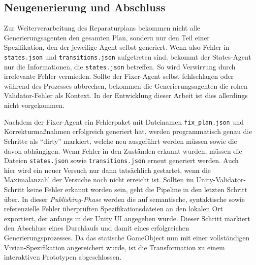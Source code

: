 \subsection*{Neugenerierung und Abschluss}

Zur Weiterverarbeitung des Reparaturplans bekommen nicht alle Generierungsagenten den gesamten Plan, sondern nur den Teil einer Spezifikation, den der jeweilige Agent selbst generiert. Wenn also Fehler in \texttt{states.json} und \texttt{transitions.json}  aufgetreten sind, bekommt der States-Agent nur die Informationen, die \texttt{states.json} betreffen. So wird Verwirrung durch irrelevante Fehler vermieden. Sollte der Fixer-Agent selbst fehlschlagen oder während des Prozesses abbrechen, bekommen die Generierungsagenten die rohen Validator-Fehler als Kontext. In der Entwicklung dieser Arbeit ist dies allerdings nicht vorgekommen.

Nachdem der Fixer-Agent ein Fehlerpaket mit Dateinamen \texttt{fix\_plan.json} und Korrekturmaßnahmen erfolgreich generiert hat, werden programmatisch genau die Schritte als \enquote{dirty} markiert, welche neu ausgeführt werden müssen sowie die davon abhängigen. Wenn \zB Fehler in den Zuständen erkannt wurden, müssen die Dateien \texttt{states.json} sowie \texttt{transitions.json} erneut generiert werden. Auch hier wird ein neuer Versuch nur dann tatsächlich gestartet, wenn die Maximalanzahl der Versuche noch nicht erreicht ist.
Sollten im Unity-Validator-Schritt keine Fehler erkannt worden sein, geht die Pipeline in den letzten Schritt über. In dieser \textit{Publishing-Phase} werden die auf semantische, syntaktische sowie referenzielle Fehler überprüften Spezifikationsdateien an den lokalen Ort exportiert, der anfangs in der Unity UI angegeben wurde. Dieser Schritt markiert den Abschluss eines Durchlaufs und damit eines erfolgreichen Generierungsprozesses. Da das statische GameObject nun mit einer vollständigen Vivian-Spezifikation angereichert wurde, ist die Transformation zu einem interaktiven Prototypen abgeschlossen.
